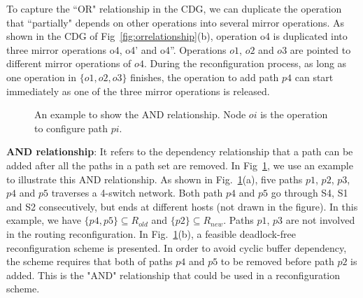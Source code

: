 To capture the ``OR" relationship in the CDG, we can duplicate the operation that ``partially" depends on other operations into several mirror operations. As shown in the CDG of Fig~\ref{fig:orrelationship}(b), operation o4 is duplicated into three mirror operations o4, o4' and o4''. Operations $o1$, $o2$ and $o3$ are pointed to different mirror operations of $o4$. During the reconfiguration process, as long as one operation in $\{o1, o2, o3\}$ finishes, the operation to add path $p4$ can start immediately as one of the three mirror operations is released.


\begin{figure}[t]
	\centering
	
	
	
	\caption{An example to show the AND relationship. Node $oi$ is the operation to configure path $pi$. }\label{fig:andrelationship}
	\vspace{-0.2in}
\end{figure}

\textbf{AND relationship}: It refers to the dependency relationship that a path can be added after all the paths in a path set are removed. In Fig~\ref{fig:andrelationship}, we use an example to illustrate this AND relationship. As shown in Fig.~\ref{fig:andrelationship}(a), five paths $p1$, $p2$, $p3$, $p4$ and $p5$ traverses a 4-switch network. Both path $p4$ and $p5$ go through S4, S1 and S2 consecutively, but ends at different hosts (not drawn in the figure). In this example, we have $\{p4, p5\}\subseteq R_{old}$ and $\{p2\}\subseteq R_{new}$. Paths $p1$, $p3$ are not involved in the routing reconfiguration.  In Fig.~\ref{fig:andrelationship}(b), a feasible deadlock-free reconfiguration scheme is presented. In order to avoid cyclic buffer dependency, the scheme requires that both of paths $p4$ and $p5$ to be removed before path $p2$ is added. This is the "AND" relationship that could be used in a reconfiguration scheme.

